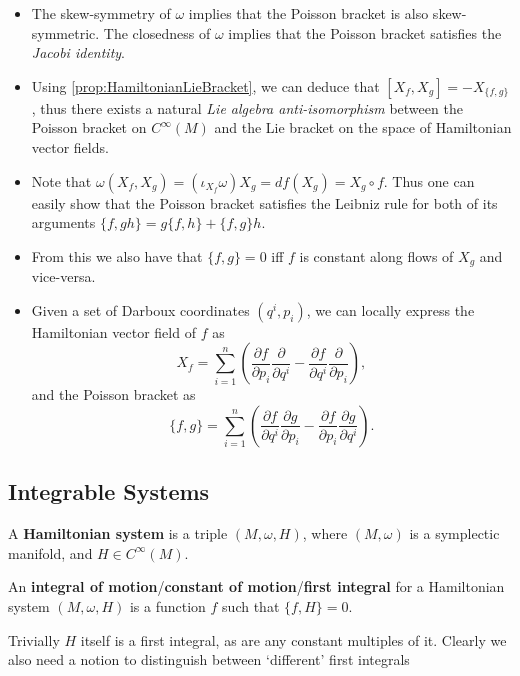 \documentclass[11pt, final]{article}
\begin{document}
\begin{remark}\hfill
	\begin{itemize}
		\item The skew-symmetry of $\omega$ implies that the Poisson bracket is also skew-symmetric. The closedness of $\omega$ implies that the Poisson bracket satisfies the \textit{Jacobi identity}.
		\item Using \autoref{prop:HamiltonianLieBracket}, we can deduce that $[X_f,X_g] = -X_{\{f,g\}}$, thus there exists a natural \textit{Lie algebra anti-isomorphism} between the Poisson bracket on $C^\infty(M)$ and the Lie bracket on the space of Hamiltonian vector fields.
		\item Note that $\omega(X_f,X_g) = \left(\iota_{X_f} \omega \right) X_g = df(X_g) = X_g \circ f$. Thus one can easily show that the Poisson bracket satisfies the Leibniz rule for both of its arguments $\{ f , gh \} = g\{f,h\} + \{f,g\}h$.
		\item From this we also have that $\{f,g\} = 0$ iff $f$ is constant along flows of $X_g$ and vice-versa.
		\item Given a set of Darboux coordinates $(q^i,p_i)$, we can locally express the Hamiltonian vector field of $f$ as
			\begin{equation}
				X_f = \sum_{i=1}^n \left( \frac{\partial f}{\partial p_i} \frac{\partial }{\partial q ^i} - \frac{\partial f}{\partial q ^i} \frac{\partial }{\partial p_i} \right),
			\end{equation}
		and the Poisson bracket as
			\begin{equation}
				\{f,g\} = \sum_{i=1}^n \left( \frac{\partial f}{\partial q^i} \frac{\partial g}{\partial p_i} - \frac{\partial f}{\partial p_i} \frac{\partial g}{\partial q ^i} \right).
			\end{equation}
	\end{itemize}
\end{remark}

\subsection{Integrable Systems}

\begin{definition}
	A \textbf{Hamiltonian system} is a triple $(M,\omega,H)$, where $(M,\omega)$ is a symplectic manifold, and $H \in C^\infty(M)$.
\end{definition}

\begin{definition}
	An \textbf{integral of motion}/\textbf{constant of motion}/\textbf{first integral} for a Hamiltonian system $(M,\omega,H)$ is a function $f$ such that $\{f,H\} = 0$.
\end{definition}
\begin{remark}
	Trivially $H$ itself is a first integral, as are any constant multiples of it. Clearly we also need a notion to distinguish between `different' first integrals
\end{remark}
\end{document}
